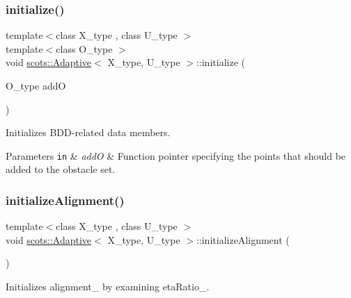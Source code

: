\subsubsection{\texorpdfstring{initialize()}{initialize()}}
{\footnotesize\ttfamily template$<$class X\+\_\+type , class U\+\_\+type $>$ \\
template$<$class O\+\_\+type $>$ \\
void \hyperlink{classscots_1_1Adaptive}{scots\+::\+Adaptive}$<$ X\+\_\+type, U\+\_\+type $>$\+::initialize (\begin{DoxyParamCaption}\item[{O\+\_\+type}]{addO }\end{DoxyParamCaption})\hspace{0.3cm}{\ttfamily [inline]}}

Initializes B\+D\+D-\/related data members. 
\begin{DoxyParams}[1]{Parameters}
\mbox{\tt in}  & {\em addO} & Function pointer specifying the points that should be added to the obstacle set. \\
\hline
\end{DoxyParams}
\mbox{\label{classscots_1_1Adaptive_a8f23922cbd2768a8339c73928ddc9c5a}} 
\subsubsection{\texorpdfstring{initialize\+Alignment()}{initializeAlignment()}}
{\footnotesize\ttfamily template$<$class X\+\_\+type , class U\+\_\+type $>$ \\
void \hyperlink{classscots_1_1Adaptive}{scots\+::\+Adaptive}$<$ X\+\_\+type, U\+\_\+type $>$\+::initialize\+Alignment (\begin{DoxyParamCaption}{ }\end{DoxyParamCaption})\hspace{0.3cm}{\ttfamily [inline]}}

Initializes alignment\+\_\+ by examining eta\+Ratio\+\_\+. \mbox{\label{classscots_1_1Adaptive_a2b4a5e42c1a4fca883c132b02295bf11}} 
